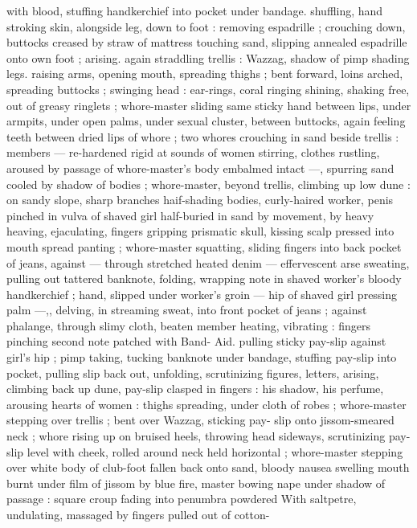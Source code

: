 with blood, stuffing handkerchief into pocket under bandage.
shuffling, hand stroking skin, alongside leg, down to foot : removing
espadrille ; crouching down, buttocks creased by straw of mattress
touching sand, slipping annealed espadrille onto own foot ; arising.
again straddling trellis : Wazzag, shadow of pimp shading legs.
raising arms, opening mouth, spreading thighs ; bent forward, loins
arched, spreading buttocks ; swinging head : ear-rings, coral ringing
shining, shaking free, out of greasy ringlets ; whore-master sliding
same sticky hand between lips, under armpits, under open palms,
under sexual cluster, between buttocks, again feeling teeth between
dried lips of whore ; two whores crouching in sand beside trellis :
members --- re-hardened rigid at sounds of women stirring, clothes
rustling, aroused by passage of whore-master's body embalmed
intact ---, spurring sand cooled by shadow of bodies ; whore-master,
beyond trellis, climbing up low dune : on sandy slope, sharp
branches haif-shading bodies, curly-haired worker, penis pinched in
vulva of shaved girl half-buried in sand by movement, by heavy
heaving, ejaculating, fingers gripping prismatic skull, kissing scalp
pressed into mouth spread panting ; whore-master squatting, sliding
fingers into back pocket of jeans, against --- through stretched
heated denim --- effervescent arse sweating, pulling out tattered
banknote, folding, wrapping note in shaved worker's bloody
handkerchief ; hand, slipped under worker's groin --- hip of shaved
girl pressing palm ---,, delving, in streaming sweat, into front pocket
of jeans ; against phalange, through slimy cloth, beaten member
heating, vibrating : fingers pinching second note patched with Band-
Aid. pulling sticky pay-slip against girl's hip ; pimp taking, tucking
banknote under bandage, stuffing pay-slip into pocket, pulling slip
back out, unfolding, scrutinizing figures, letters, arising, climbing
back up dune, pay-slip clasped in fingers : his shadow, his perfume,
arousing hearts of women : thighs spreading, under cloth of robes ;
whore-master stepping over trellis ; bent over Wazzag, sticking pay-
slip onto jissom-smeared neck ; whore rising up on bruised heels,
throwing head sideways, scrutinizing pay-slip level with cheek, rolled
around neck held horizontal ; whore-master stepping over white body
of club-foot fallen back onto sand, bloody nausea swelling mouth
burnt under film of jissom by blue fire, master bowing nape under
shadow of passage : square croup fading into penumbra powdered
With saltpetre, undulating, massaged by fingers pulled out of cotton-
